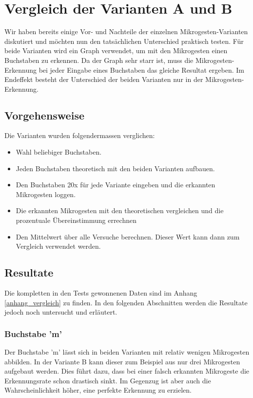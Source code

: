 \chapter{Vergleich der Varianten A und B}
Wir haben bereits einige Vor- und Nachteile der einzelnen Mikrogesten-Varianten diskutiert und möchten nun den tatsächlichen Unterschied praktisch testen. Für beide Varianten wird  ein Graph verwendet, um mit den Mikrogesten einen Buchstaben zu erkennen. Da der Graph sehr starr ist, muss die Mikrogesten-Erkennung bei jeder Eingabe eines Buchstaben das gleiche Resultat ergeben. Im Endeffekt besteht der Unterschied der beiden Varianten nur in der Mikrogesten-Erkennung.

\section{Vorgehensweise}
Die Varianten wurden folgendermassen verglichen:
\begin{itemize}
\item Wahl beliebiger Buchstaben.
\item Jeden Buchstaben theoretisch mit den beiden Varianten aufbauen.
\item Den Buchstaben 20x für jede Variante eingeben und die erkannten Mikrogesten loggen.
\item Die erkannten Mikrogesten mit den theoretischen vergleichen und die prozentuale Übereinstimmung errechnen
\item Den Mittelwert über alle Versuche berechnen. Dieser Wert kann dann zum Vergleich verwendet werden.
\end{itemize}

\section{Resultate}
Die kompletten in den Tests gewonnenen Daten sind im Anhang \ref{anhang_vergleich} zu finden. In den folgenden Abschnitten werden die Resultate jedoch noch untersucht und erläutert.

\subsection{Buchstabe 'm'}
Der Buchstabe 'm' lässt sich in beiden Varianten mit relativ wenigen Mikrogesten abbilden. In der Variante B kann dieser zum Beispiel aus nur drei Mikrogesten aufgebaut werden. Dies führt dazu, dass bei einer falsch erkannten Mikrogeste die Erkennungsrate schon drastisch sinkt. Im Gegenzug ist aber auch die Wahrscheinlichkeit höher, eine perfekte Erkennung zu erzielen.

